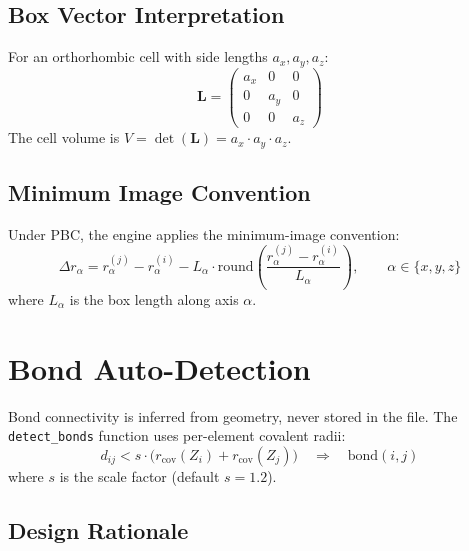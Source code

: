 \documentclass[12pt, a4paper, oneside]{article}
\begin{document}
\subsection{Box Vector Interpretation}

For an orthorhombic cell with side lengths $a_x, a_y, a_z$:
\begin{equation}
  \mathbf{L} =
  \begin{pmatrix}
    a_x & 0   & 0   \\
    0   & a_y & 0   \\
    0   & 0   & a_z
  \end{pmatrix}
  \label{eq:lattice}
\end{equation}
The cell volume is $V = \det(\mathbf{L}) = a_x \cdot a_y \cdot a_z$.

\subsection{Minimum Image Convention}

Under PBC, the engine applies the minimum-image convention:
\begin{equation}
  \Delta r_\alpha = r_\alpha^{(j)} - r_\alpha^{(i)}
    - L_\alpha \cdot \mathrm{round}\!\left(
      \frac{r_\alpha^{(j)} - r_\alpha^{(i)}}{L_\alpha}
    \right),
  \qquad \alpha \in \{x, y, z\}
  \label{eq:mic}
\end{equation}
where $L_\alpha$ is the box length along axis $\alpha$.

\section{Bond Auto-Detection}
\label{sec:bonds}

Bond connectivity is inferred from geometry, never stored in the file.
The \texttt{detect\_bonds} function uses per-element covalent radii:
\begin{equation}
  d_{ij} < s \cdot \bigl(r_{\text{cov}}(Z_i) + r_{\text{cov}}(Z_j)\bigr)
  \quad \Longrightarrow \quad \text{bond}(i, j)
  \label{eq:bond}
\end{equation}
where $s$ is the scale factor (default $s = 1.2$).

\subsection{Design Rationale}
\end{document}
